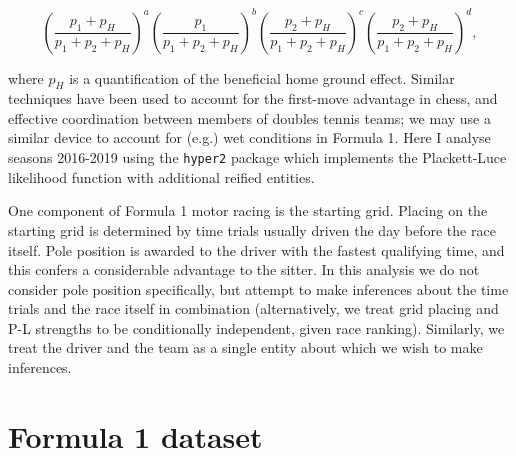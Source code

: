 \documentclass[a4,12pt]{article}
\begin{document}
\[
\left(\frac{p_1+p_H}{p_1+p_2+p_H}\right)^a
\left(\frac{p_1}{p_1+p_2+p_H}\right)^b
\left(\frac{p_2+p_H}{p_1+p_2+p_H}\right)^c
\left(\frac{p_2+p_H}{p_1+p_2+p_H}\right)^d,
\]

\noindent where $p_H$ is a quantification of the beneficial home
ground effect.  Similar techniques have been used to account for the
first-move advantage in chess, and effective coordination between
members of doubles tennis teams; we may use a similar device to
account for (e.g.) wet conditions in Formula 1.  Here I analyse
seasons 2016-2019 using the \texttt{hyper2} package \citep{hankin2017}
which implements the Plackett-Luce likelihood function with additional
reified entities.

One component of Formula 1 motor racing is the starting grid.  Placing
on the starting grid is determined by time trials usually driven the
day before the race itself.  Pole position is awarded to the driver
with the fastest qualifying time, and this confers a considerable
advantage to the sitter.  In this analysis we do not consider pole
position specifically, but attempt to make inferences about the time
trials and the race itself in combination (alternatively, we treat
grid placing and P-L strengths to be conditionally independent, given
race ranking).  Similarly, we treat the driver and the team as a
single entity about which we wish to make inferences.


\section{\centering Formula 1 dataset}\label{formula-1-dataset}
\end{document}
